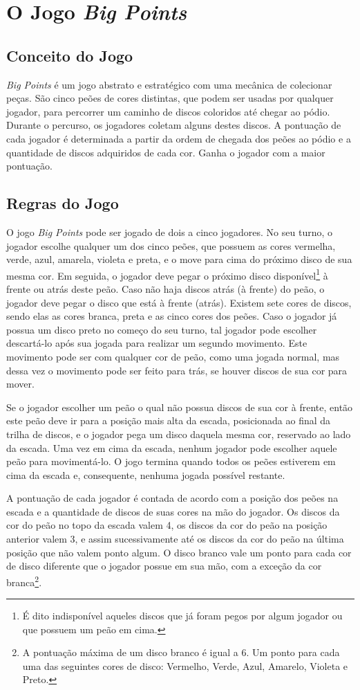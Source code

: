 
\section{O Jogo \emph{Big Points}}
\subsection{Conceito do Jogo}
\label{subsec:conceito-do-jogo}
\emph{Big Points} é um jogo abstrato e estratégico com uma mecânica de colecionar peças. São cinco peões de cores distintas, que podem ser usadas por qualquer jogador, para percorrer um caminho de discos coloridos até chegar ao pódio. Durante o percurso, os jogadores coletam alguns destes discos. A pontuação de cada jogador é determinada a partir da ordem de chegada dos peões ao pódio e a quantidade de discos adquiridos de cada cor. Ganha o jogador com a maior pontuação.

\subsection{Regras do Jogo}
\label{subsec:regras-do-jogo}
O jogo \emph{Big Points} pode ser jogado de dois a cinco jogadores. No seu turno, o jogador escolhe qualquer um dos cinco peões, que possuem as cores vermelha, verde, azul, amarela, violeta e preta, e o move para cima do próximo disco de sua mesma cor. Em seguida, o jogador deve pegar o próximo disco disponível\footnote{É dito indisponível aqueles discos que já foram pegos por algum jogador ou que possuem um peão em cima.} à frente ou atrás deste peão. Caso não haja discos atrás (à frente) do peão, o jogador deve pegar o disco que está à frente (atrás). Existem sete cores de discos, sendo elas as cores branca, preta e as cinco cores dos peões. Caso o jogador já possua um disco preto no começo do seu turno, tal jogador pode escolher descartá-lo após sua jogada para realizar um segundo movimento. Este movimento pode ser com qualquer cor de peão, como uma jogada normal, mas dessa vez o movimento pode ser feito para trás, se houver discos de sua cor para mover.

Se o jogador escolher um peão o qual não possua discos de sua cor à frente, então este peão deve ir para a posição mais alta da escada, posicionada ao final da trilha de discos, e o jogador pega um disco daquela mesma cor, reservado ao lado da escada. Uma vez em cima da escada, nenhum jogador pode escolher aquele peão para movimentá-lo. O jogo termina quando todos os peões estiverem em cima da escada e, consequente, nenhuma jogada possível restante.

A pontuação de cada jogador é contada de acordo com a posição dos peões na escada e a quantidade de discos de suas cores na mão do jogador. Os discos da cor do peão no topo da escada valem 4, os discos da cor do peão na posição anterior valem 3, e assim sucessivamente até os discos da cor do peão na última posição que não valem ponto algum. O disco branco vale um ponto para cada cor de disco diferente que o jogador possue em sua mão, com a exceção da cor branca\footnote{A pontuação máxima de um disco branco é igual a 6. Um ponto para cada uma das seguintes cores de disco: Vermelho, Verde, Azul, Amarelo, Violeta e Preto.}.
